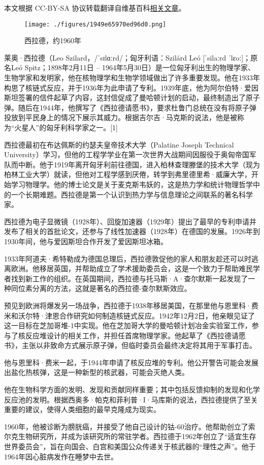 
本文根据 CC-BY-SA 协议转载翻译自维基百科\href{https://en.wikipedia.org/wiki/Leo_Szilard}{相关文章}。

\begin{figure}[ht]
\centering
\texttt{[image: ./figures/1949e65970ed96d0.png]}
\caption{西拉德，约1960年} \label{fig_Szilar_1}
\end{figure}
莱奥·西拉德（Leo Szilard，/ˈsɪlɑːrd/；匈牙利语：Szilárd Leó [ˈsilaːrd ˈlɛoː]；原名Leó Spitz；1898年2月11日 – 1964年5月30日）是一位匈牙利出生的物理学家、生物学家和发明家，他在核物理学和生物学领域做出了许多重要发现。他在1933年构思了核链式反应，并于1936年为此申请了专利。1939年底，他为阿尔伯特·爱因斯坦签署的信件起草了内容，这封信促成了曼哈顿计划的启动，最终制造出了原子弹。随后在1944年，他撰写了《西拉德请愿书》，要求杜鲁门总统在没有将原子弹投放到平民身上的情况下展示其威力。根据吉尔吉·马克斯的说法，他是被称为“火星人”的匈牙利科学家之一。[1]

西拉德最初在布达佩斯的约瑟夫皇帝技术大学（Palatine Joseph Technical University）学习，但他的工程学学业在第一次世界大战期间因服役于奥匈帝国军队而中断。他于1919年离开匈牙利前往德国，进入柏林查理滕堡的技术大学（现为柏林工业大学）就读，但他对工程学感到厌倦，转学到弗里德里希·威廉大学，开始学习物理学。他的博士论文是关于麦克斯韦妖的，这是热力学和统计物理哲学中的一个长期难题。西拉德是第一个认识到热力学与信息理论之间联系的著名科学家。

西拉德为电子显微镜（1928年）、回旋加速器（1929年）提出了最早的专利申请并发布了相关的首批论文，还参与了线性加速器（1928年）在德国的发展。1926年到1930年间，他与爱因斯坦合作开发了爱因斯坦冰箱。

1933年阿道夫·希特勒成为德国总理后，西拉德敦促他的家人和朋友趁还可以时逃离欧洲。他移居英国，并帮助成立了学术援助委员会，这是一个致力于帮助难民学者找到新工作的组织。在英国期间，西拉德与托马斯·A·查尔默斯一起发现了一种同位素分离的方法，这就是著名的西拉德-查尔默斯效应。

预见到欧洲将爆发另一场战争，西拉德于1938年移居美国，在那里他与恩里科·费米和沃尔特·津恩合作研究如何制造核链式反应。1942年12月2日，他亲眼见证了这一目标在芝加哥堆-1中实现。他在芝加哥大学的曼哈顿计划冶金实验室工作，参与了核反应堆设计的相关工作，并担任首席物理学家。他起草了《西拉德请愿书》，主张以非致命方式展示原子弹，但临时委员会最终决定将其用于军事打击。

他与恩里科·费米一起，于1944年申请了核反应堆的专利。他公开警告可能会发展出盐化热核弹，这是一种新型的核武器，可能会灭绝人类。

他在生物科学方面的发明、发现和贡献同样重要；其中包括反馈抑制的发现和化学反应池的发明。根据西奥多·帕克和菲利普·I·马库斯的说法，西拉德提供了至关重要的建议，使得人类细胞的最早克隆成为现实。

1960年，他被诊断为膀胱癌，并接受了他自己设计的钴-60治疗。他帮助创立了索尔克生物研究所，并成为该研究所的常驻学者。西拉德于1962年创立了“适宜生存世界委员会”，旨在向国会、白宫和美国公众传递关于核武器的“理性之声”。他于1964年因心脏病发作在睡梦中去世。